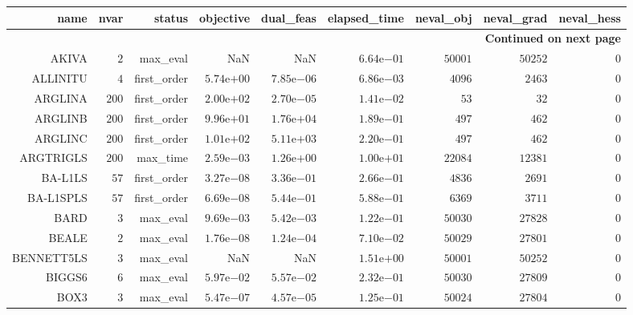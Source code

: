 \begin{longtable}{rrrrrrrrr}
\hline
name & nvar & status & objective & dual\_feas & elapsed\_time & neval\_obj & neval\_grad & neval\_hess \\\hline
\endhead
\hline
\multicolumn{9}{r}{{\bfseries Continued on next page}}\\
\hline
\endfoot
\endlastfoot
AKIVA & \(     2\) & max\_eval &       NaN &       NaN & \( 6.64\)e\(-01\) & \( 50001\) & \( 50252\) & \(     0\) \\
ALLINITU & \(     4\) & first\_order & \( 5.74\)e\(+00\) & \( 7.85\)e\(-06\) & \( 6.86\)e\(-03\) & \(  4096\) & \(  2463\) & \(     0\) \\
ARGLINA & \(   200\) & first\_order & \( 2.00\)e\(+02\) & \( 2.70\)e\(-05\) & \( 1.41\)e\(-02\) & \(    53\) & \(    32\) & \(     0\) \\
ARGLINB & \(   200\) & first\_order & \( 9.96\)e\(+01\) & \( 1.76\)e\(+04\) & \( 1.89\)e\(-01\) & \(   497\) & \(   462\) & \(     0\) \\
ARGLINC & \(   200\) & first\_order & \( 1.01\)e\(+02\) & \( 5.11\)e\(+03\) & \( 2.20\)e\(-01\) & \(   497\) & \(   462\) & \(     0\) \\
ARGTRIGLS & \(   200\) & max\_time & \( 2.59\)e\(-03\) & \( 1.26\)e\(+00\) & \( 1.00\)e\(+01\) & \( 22084\) & \( 12381\) & \(     0\) \\
BA-L1LS & \(    57\) & first\_order & \( 3.27\)e\(-08\) & \( 3.36\)e\(-01\) & \( 2.66\)e\(-01\) & \(  4836\) & \(  2691\) & \(     0\) \\
BA-L1SPLS & \(    57\) & first\_order & \( 6.69\)e\(-08\) & \( 5.44\)e\(-01\) & \( 5.88\)e\(-01\) & \(  6369\) & \(  3711\) & \(     0\) \\
BARD & \(     3\) & max\_eval & \( 9.69\)e\(-03\) & \( 5.42\)e\(-03\) & \( 1.22\)e\(-01\) & \( 50030\) & \( 27828\) & \(     0\) \\
BEALE & \(     2\) & max\_eval & \( 1.76\)e\(-08\) & \( 1.24\)e\(-04\) & \( 7.10\)e\(-02\) & \( 50029\) & \( 27801\) & \(     0\) \\
BENNETT5LS & \(     3\) & max\_eval &       NaN &       NaN & \( 1.51\)e\(+00\) & \( 50001\) & \( 50252\) & \(     0\) \\
BIGGS6 & \(     6\) & max\_eval & \( 5.97\)e\(-02\) & \( 5.57\)e\(-02\) & \( 2.32\)e\(-01\) & \( 50030\) & \( 27809\) & \(     0\) \\
BOX3 & \(     3\) & max\_eval & \( 5.47\)e\(-07\) & \( 4.57\)e\(-05\) & \( 1.25\)e\(-01\) & \( 50024\) & \( 27804\) & \(     0\) \\

\end{longtable}
